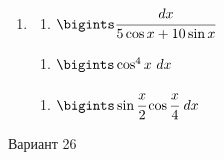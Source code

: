 \documentclass{article}
\begin{document}
\begin{multicols}{2}
\begin{enumerate}[label=\Roman*.]
		\item
		\begin{multicols}{3}
			\begin{enumerate}[label=\arabic*.]
				\setlength\itemsep{1em}
				\item $\bigints\cfrac{dx}{5\cos x + 10 \sin x}$
			\end{enumerate}
			\vfill\null\columnbreak
			\begin{enumerate}[label=\arabic*., start=2]
				\setlength\itemsep{1em}
				\item $\bigints\cos^4x\ dx$
			\end{enumerate}
			\vfill\null\columnbreak
			\begin{enumerate}[label=\arabic*., start=3]
				\setlength\itemsep{1em}
				\item $\bigints\sin\cfrac{x}{2}\cos\cfrac{x}{4}\ dx$
			\end{enumerate}
			\vfill\null\columnbreak
		\end{multicols}
	\end{enumerate}
	
	\vfill\null\columnbreak
	
	\centerline{Вариант 26}
	

\end{multicols}
\end{document}
